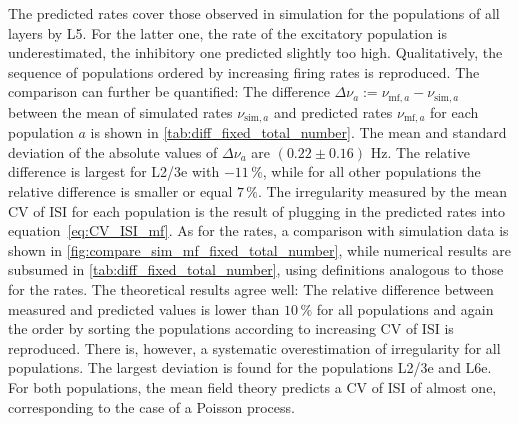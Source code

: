 The predicted rates cover those observed in simulation for the populations 
of all layers by L5. For the latter one, the rate of the excitatory population
is underestimated, the inhibitory one predicted slightly too high. 
Qualitatively, the sequence of populations ordered by increasing firing rates is reproduced.
The comparison can further be quantified: The difference 
$    \Delta \nu_a := \nu_{\text{mf}, a} - \nu_{\text{sim}, a} $
between the mean of simulated rates $\nu_{\text{sim}, a}$ and predicted rates 
$\nu_{\text{mf}, a}$ for each population $a$ is shown in \autoref{tab:diff_fixed_total_number}. 
The mean and standard 
deviation of the absolute values of $\Delta \nu_a$ 
are $(0.22 \pm  0.16)$ Hz. The relative difference
is largest for L2/3e with $-11\,\%$, while for all other populations 
the relative difference is smaller or equal $7\,\%$. 
The irregularity measured by the mean CV of ISI for each population is the result of 
plugging in the predicted rates into equation~\eqref{eq:CV_ISI_mf}. 
As for the rates, a comparison with simulation data is shown
in \autoref{fig:compare_sim_mf_fixed_total_number}, 
while numerical results are subsumed in 
\autoref{tab:diff_fixed_total_number}, using definitions analogous to those for the rates.
The theoretical results agree well: The relative difference between measured and
predicted values is lower than $10\,\%$ for all populations and again the order 
by sorting the populations according to increasing CV of ISI is reproduced. 
There is, however, a systematic overestimation of irregularity for all populations. 
The largest deviation is found for the populations L2/3e and L6e. For both populations, 
the mean field theory predicts a CV of ISI of almost one, corresponding to the case of 
a Poisson process. 

